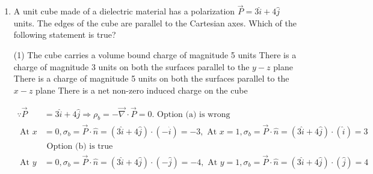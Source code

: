 \begin{enumerate}
 \begin{tasks}(1)
	\task[\textbf{a.}]The bound surface charge density is $P_{0} \cos \theta$
	\task[\textbf{b.}]The electric field at a distance $r$ on the $z$ - axis varies as $\frac{1}{r^{2}}$ for $r>>$
	\task[\textbf{c.}]The electric potential at a distance $2 R$ on the $z$ - axis is $\frac{P_{0} R}{12 \varepsilon_{0}}$
	\task[\textbf{d.}] The electric field outside is equivalent to that of a dipole at the origin	
\end{tasks}	
\begin{answer}
	$$
	\begin{aligned}
	\sigma_{b}&=\vec{P} \cdot \hat{n}=\left(P_{0} \hat{z}\right) \cdot \hat{r}=P_{0} \cos \theta\\
	V_{d i p}&=\frac{1}{4 \pi \varepsilon_{0}} \frac{\vec{p} \cdot \hat{r}}{r^{2}}=\frac{1}{4 \pi \varepsilon_{0}} \frac{4 \pi R^{3}}{3} \frac{\vec{P} \cdot \hat{r}}{r^{2}}=\frac{1}{4 \pi \varepsilon_{0}} \frac{4 \pi R^{3}}{3} \frac{\left(P_{0} \hat{z}\right) . \hat{z}}{(2 R)^{2}}=\frac{P_{0} R}{12 \varepsilon_{0}}
\end{aligned}
$$
So the correct answer is \textbf{Option (b)}
\end{answer}
\item  A unit cube made of a dielectric material has a polarization $\vec{P}=3 \hat{i}+4 \hat{j}$ units. The edges of the cube are parallel to the Cartesian axes. Which of the following statement is true?	
 \begin{tasks}(1)
	\task[\textbf{a.}]The cube carries a volume bound charge of magnitude 5 units
	\task[\textbf{b.}]There is a charge of magnitude 3 units on both the surfaces parallel to the $y-z$ plane
	\task[\textbf{c.}]There is a charge of magnitude 5 units on both the surfaces parallel to the $x-z$ plane
	\task[\textbf{d.}] There is a net non-zero induced charge on the cube
\end{tasks}	
\begin{answer}
	$$
	\begin{aligned}
	\because \vec{P}&=3 \hat{i}+4 \hat{j} \Rightarrow \rho_{b}=-\vec{\nabla} \cdot \vec{P}=0 \text {. Option (a) is wrong }\\
	\text { At } x&=0, \sigma_{b}=\vec{P} \cdot \hat{n}=(3 \hat{i}+4 \hat{j}) \cdot(-\hat{i})=-3, \text { At } x=1, \sigma_{b}=\vec{P} \cdot \hat{n}=(3 \hat{i}+4 \hat{j}) \cdot(\hat{i})=3\\
	&\text { Option (b) is true }\\
	\text { At } y&=0, \sigma_{b}=\vec{P} \cdot \hat{n}=(3 \hat{i}+4 \hat{j}) \cdot(-\hat{j})=-4, \text { At } y=1, \sigma_{b}=\vec{P} \cdot \hat{n}=(3 \hat{i}+4 \hat{j}) \cdot(\hat{j})=4\\

\end{aligned}$$
\end{answer}
\end{enumerate}
